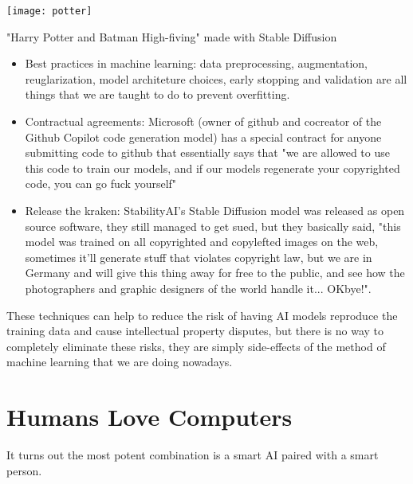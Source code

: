 \begin{marginfigure}[-5.5cm]
        \texttt{[image: potter]}
        \caption{"Harry Potter and Batman High-fiving" made with Stable Diffusion}
\end{marginfigure}

\begin{itemize}
\item Best practices in  machine learning: data preprocessing, augmentation, reuglarization, model architeture choices, early stopping and validation are all things that we are taught to do to prevent overfitting.
\item Contractual agreements: Microsoft (owner of github and cocreator of the Github Copilot code generation model) has a special contract for anyone submitting code to github that essentially says that "we are allowed to use this code to train our models, and if our models regenerate your copyrighted code, you can go fuck yourself"
\item Release the kraken: StabilityAI's Stable Diffusion model was released as open source software, they still managed to get sued, but they basically said, "this model was trained on all copyrighted and copylefted images on the web, sometimes it'll generate stuff that violates copyright law, but we are in Germany and will give this thing away for free to the public, and see how the photographers and graphic designers of the world handle it... OKbye!". 
\end{itemize}

These techniques can help to reduce the risk of having AI models reproduce the training data and cause intellectual property disputes, but there is no way to completely eliminate these risks, they are simply side-effects of the method of machine learning that we are doing nowadays.

\section{Humans Love Computers}

It turns out the most potent combination is a smart AI paired with a smart person. 

